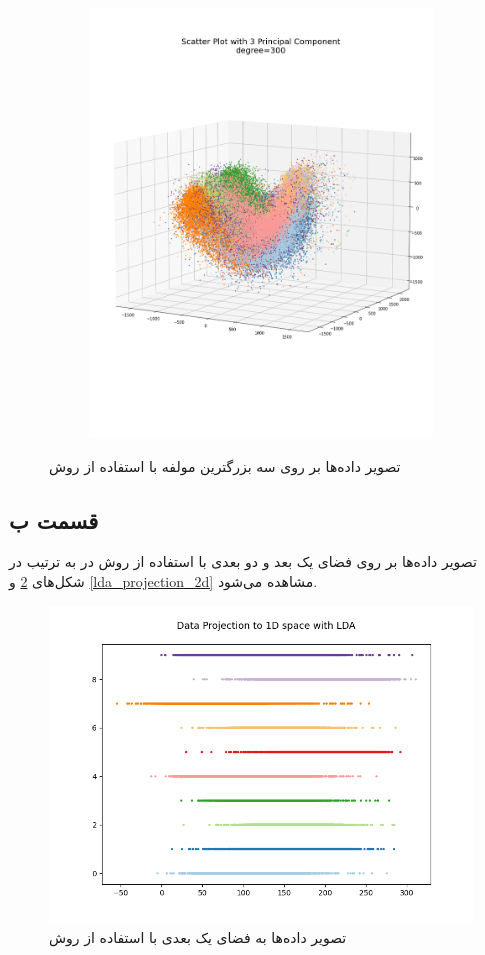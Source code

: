 \documentclass[12pt, a4paper]{article}
\begin{document}
\begin{figure}[h]
\begin{subfigure}{0.3\linewidth}
        \includegraphics[width=\linewidth]{images/q4/a/projection_to_3d_with_angle300.png}
    \end{subfigure}
    \caption{تصویر داده‌ها بر روی سه بزرگترین مولفه با استفاده از روش }
    \label{pca_3d_projection}
\end{figure}
\clearpage

\subsection*{قسمت ب}

تصویر داده‌ها بر روی فضای یک بعد و دو بعدی با استفاده از روش  در
به ترتیب در شکل‌های \ref{lda_projection_1d}
و \ref{lda_projection_2d} مشاهده می‌شود.

\begin{figure}[h]
    \centering
    \includegraphics[width=0.7\linewidth]{images/q4/b/projection_to_1d.png}
    \caption{تصویر داده‌ها به فضای یک بعدی با استفاده از روش }
    \label{lda_projection_1d}
\end{figure}
\end{document}
